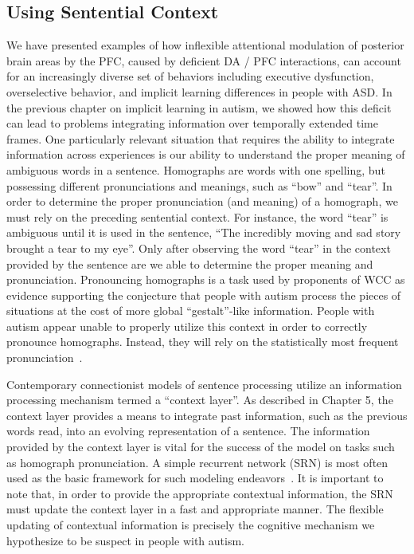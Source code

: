 %
%

\subsection{Using Sentential Context}
We have presented examples of how inflexible attentional modulation of posterior brain areas by the PFC, caused by deficient DA / PFC interactions, can account for an increasingly diverse set of behaviors including executive dysfunction, overselective behavior, and implicit learning differences in people with ASD.  In the previous chapter on implicit learning in autism, we showed how this deficit can lead to problems integrating information over temporally extended time frames.  One particularly relevant situation that requires the ability to integrate information across experiences is our ability to understand the proper meaning of ambiguous words in a sentence.  Homographs are words with one spelling, but possessing different pronunciations and meanings, such as ``bow'' and ``tear''.  In order to determine the proper pronunciation (and meaning) of a homograph, we must rely on the preceding sentential context.  For instance, the word ``tear'' is ambiguous until it is used in the sentence, ``The incredibly moving and sad story brought a tear to my eye''.  Only after observing the word ``tear'' in the context provided by the sentence are we able to determine the proper meaning and pronunciation.  Pronouncing homographs is a task used by proponents of WCC as evidence supporting the conjecture that people with autism process the pieces of situations at the cost of more global ``gestalt''-like information.  People with autism appear unable to properly utilize this context in order to correctly pronounce homographs.  Instead, they will rely on the statistically most frequent pronunciation~\cite{RefWorks:103,HappeF:1997:WCC_Homographs}.  

Contemporary connectionist models of sentence processing utilize an information processing mechanism termed a ``context layer''.  As described in Chapter 5, the context layer provides a means to integrate past information, such as the previous words read, into an evolving representation of a sentence.  The information provided by the context layer is vital for the success of the model on tasks such as homograph pronunciation.  A simple recurrent network (SRN) is most often used as the basic framework for such modeling endeavors~\cite{ElmanJ:1990:SRN}.  It is important to note that, in order to provide the appropriate contextual information, the SRN must update the context layer in a fast and appropriate manner.  The flexible updating of contextual information is precisely the cognitive mechanism we hypothesize to be suspect in people with autism.  

